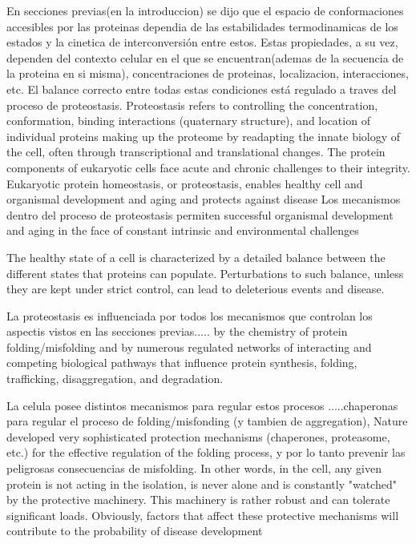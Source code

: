 En secciones previas(en la introduccion) se dijo que el espacio de conformaciones accesibles por las proteinas dependia de las estabilidades termodinamicas de los estados y la cinetica de interconversión entre estos. 
Estas propiedades, a su vez, dependen del contexto celular en el que se encuentran(ademas de la secuencia de la proteina en si misma), concentraciones de proteinas, localizacion, interacciones, etc.
El balance correcto entre todas estas condiciones está regulado a traves del proceso de proteostasis.
Proteostasis refers to controlling the concentration, conformation, binding interactions (quaternary structure), and location of individual proteins making up the proteome by readapting the innate biology of the cell, 
often through transcriptional and translational changes.
The protein components of eukaryotic cells face acute and chronic challenges to their integrity. Eukaryotic protein homeostasis, or proteostasis, enables healthy cell and organismal development and aging and protects against disease
Los mecanismos dentro del proceso de proteostasis permiten successful organismal development and aging in the face of constant intrinsic and environmental challenges %

The healthy state of a cell is characterized by a detailed balance between the different states that proteins can populate. 
Perturbations to such balance, unless they are kept under strict control, can lead to deleterious events and disease.


La proteostasis es influenciada por todos los mecanismos que controlan los aspectis vistos en las secciones previas..... by the chemistry of protein folding/misfolding and by numerous regulated networks of interacting and competing biological pathways 
that influence protein synthesis, folding, trafficking, disaggregation, and degradation.

La celula posee distintos mecanismos para regular estos procesos .....chaperonas para regular el proceso de folding/misfonding (y tambien de aggregation), 
Nature developed very sophisticated protection mechanisms (chaperones, proteasome, etc.) for the effective regulation of the folding process, y por lo tanto prevenir las peligrosas consecuencias de misfolding. 
In other words, in the cell, any given protein is not acting in the isolation, is never alone and is constantly "watched" by the protective machinery. This machinery is rather robust and can
tolerate significant loads. Obviously, factors that affect these protective mechanisms will contribute to the probability of disease development


